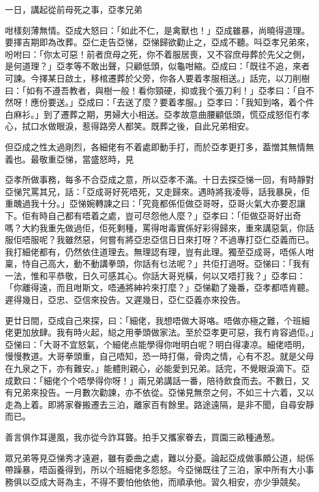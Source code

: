 \documentclass[a5paper, 12pt, openany]{book} %
\begin{document}
	一日，講起從前母死之事，亞孝兄弟

	咁樣刻薄無情。亞成大怒曰：「如此不仁，是禽獸也！」亞成雖暴，尚曉得道理。要擇吉期即為改葬。亞仁走告亞悌，亞悌歸欲勸止之，亞成不聽。呌亞孝兄弟來，吩咐曰：「你太可惡！前者庶母之死，你不着服居喪，又不容庶母葬於先父之側，是何道理？」亞孝等不敢出聲，只顧低頭，似龜咁縮。亞成曰：「既往不追，來者可諫。今擇某日啟土，移棺遷葬於父旁，你各人要着孝服相送。」話完，以刀削樹曰：「如有不遵吾教者，與樹一般！看你頸硬，抑或我个張刀利！」亞孝曰：「自不然呀！應份要送。」亞成曰：「去送了麼？要着孝服。」亞孝曰：「我知到咯，着个件白麻衫。」到了遷葬之期，男婦大小相送。亞孝故意曲腰顧低頭，慌亞成怒佢冇孝心，拭口水做眼淚，惹得路旁人都笑。既葬之後，自此兄弟相安。

	但亞成之性太過剛烈，各細佬有不着處即動手打，而於亞孝更打多，葢憎其無情無義也。最敬重亞悌，當盛怒時，見

	亞孝所做事務，每多不合亞成之意，所以亞孝不滿。十日去探亞悌一回，有時靜對亞悌咒罵其兄，話：「亞成哥好死唔死，又走歸來。遇時將我凌辱，話我暴戾，佢重醜過我十分。」亞悌婉轉諫之曰：「究竟都係佢做亞哥呀，亞哥火氣大亦要忍讓下。佢有時自己都有唔着之處，豈可尽怨他人麼？」亞孝曰：「佢做亞哥好出奇嗎？大約我重先做過佢，佢死剩種，罵得咁毒實係好彩得歸來，重來講惡氣，你話服佢唔服呢？我雖然惡，何嘗有將亞忠亞信日日來打呀？不過專打亞仁亞義而已。我打細佬都有，仍然依住道理去。無理認有理，豈有此理。獨至亞成哥，唔係人咁稟，恃自己高大，動不動講拳頭，你話有乜法呢？」共佢打過呀。亞悌曰：「我有一法，惟和平恭敬，日久可感其心。你話大哥兇橫，何以又唔打我？」亞孝曰：「你離得遠，而且咁斯文，唔通將紳衿來打麼？」亞悌勸了幾番，亞孝都唔肯聽。遲得幾日，亞忠、亞信來投告。又遲幾日，亞仁亞義亦來投告。

	更廿日間，亞成自己來探，曰：「細佬，我想唔做大哥咯。唔做亦極之難，个班細佬更加放肆。我有時火起，縂之用拳頭做家法。至於亞孝更可惡，我冇肯容過佢。」亞悌曰：「大哥不宜怒氣，个細佬点能學得你咁明白呢？明白得凄凉。細佬唔明，慢慢教道。大哥拳頭重，自己唔知，恐一時打傷，骨肉之情，心有不忍。就是父母在九泉之下，亦有難安。」能體則親心，必能愛到兄弟。話完，不覺眼淚滴下。亞成歎曰：「細佬个个唔學得你呀！」兩兄弟講話一番，陪待飲食而去。不數日，又有兄弟來投告。一月數次勸諫，亦不依從。亞悌見無奈之何，不如三十六着，又以走為上着。即將家眷搬遷去三泊，離家百有餘里。路途遠隔，是非不聞，自尋安靜而已。

	善言俱作耳邊風，我亦從今詐耳聾。拍手又攜家眷去，買園三畝種通葱。

	眾兄弟等見亞悌秀才遠避，雖有委曲之處，難以分憂。論起亞成做事頗公道，縂係帶躁暴，唔函養得到，所以个班細佬多怨怒。今亞悌既往了三泊，家中所有大小事務俱以亞成大哥為主，不得不要怕他依他，而順承他。習久相安，亦少爭競矣。
\end{document}
